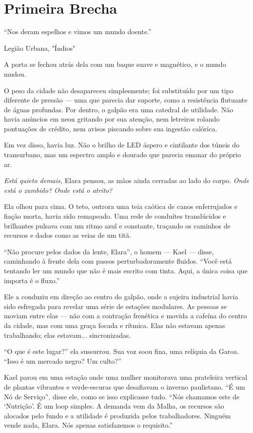 
\chapter{Primeira Brecha}
\epigraph{``Nos deram espelhos e vimos um mundo doente.''}{Legião Urbana, "Índios"}

A porta se fechou atrás dela com um baque suave e magnético, e o mundo mudou.

O peso da cidade não desapareceu simplesmente; foi substituído por um tipo diferente de pressão --- uma que parecia dar suporte, como a resistência flutuante de águas profundas. Por dentro, o galpão era uma catedral de utilidade. Não havia anúncios em neon gritando por sua atenção, nem letreiros rolando pontuações de crédito, nem avisos piscando sobre sua ingestão calórica.

Em vez disso, havia luz. Não o brilho de LED áspero e cintilante dos túneis do transurbano, mas um espectro amplo e dourado que parecia emanar do próprio ar.

\textit{Está quieto demais,} Elara pensou, as mãos ainda cerradas ao lado do corpo. \textit{Onde está o zumbido? Onde está o atrito?}

Ela olhou para cima. O teto, outrora uma teia caótica de canos enferrujados e fiação morta, havia sido remapeado. Uma rede de conduítes translúcidos e brilhantes pulsava com um ritmo azul e constante, traçando os caminhos de recursos e dados como as veias de um titã.

``Não procure pelos dados da lente, Elara'', o homem --- Kael --- disse, caminhando à frente dela com passos perturbadoramente fluidos. ``Você está tentando ler um mundo que não é mais escrito com tinta. Aqui, a única coisa que importa é o fluxo.''

Ele a conduziu em direção ao centro do galpão, onde a sujeira industrial havia sido esfregada para revelar uma série de estações modulares. As pessoas se moviam entre elas --- não com a contração frenética e movida a cafeína do centro da cidade, mas com uma graça focada e rítmica. Elas não estavam apenas trabalhando; elas estavam... sincronizadas.

``O que é este lugar?'' ela sussurrou. Sua voz soou fina, uma relíquia da Garoa. ``Isso é um mercado negro? Um culto?''

Kael parou em uma estação onde uma mulher monitorava uma prateleira vertical de plantas vibrantes e verde-escuras que desafiavam o inverno paulistano. ``É um Nó de Serviço'', disse ele, como se isso explicasse tudo. ``Nós chamamos este de `Nutrição'. É um loop simples. A demanda vem da Malha, os recursos são alocados pelo fundo e a utilidade é produzida pelos trabalhadores. Ninguém vende nada, Elara. Nós apenas satisfazemos o requisito.''

